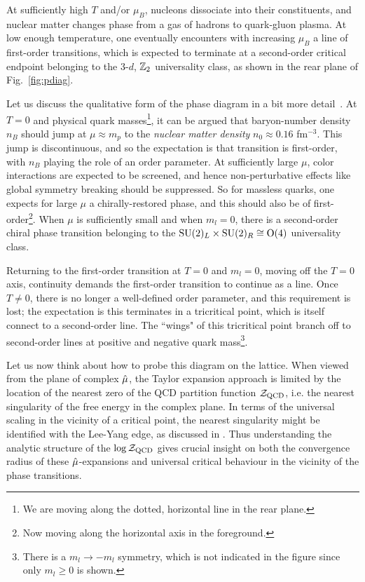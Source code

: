 At sufficiently high $T$ and/or $\mu_B$, nucleons dissociate into their constituents, 
and nuclear matter changes phase from a gas of hadrons to quark-gluon plasma.
At low enough temperature, one eventually encounters with increasing $\mu_B$ a line of 
first-order transitions, which is expected to terminate at a second-order critical 
endpoint belonging to the 3-$d$, $\mathbb{Z}_2$ universality class, as shown in the rear 
plane of Fig.~\ref{fig:pdiag}.

Let us discuss the qualitative form of the phase diagram in a bit more 
detail~\cite{halasz_phase_1998}.
At $T=0$ and physical quark masses\footnote{We are moving along the dotted,
horizontal line in the rear plane.}, it can be argued that baryon-number 
density $n_B$ should jump at
$\mu\approx m_p$ to the {\it nuclear matter density} $n_0\approx 0.16$ fm$^{-3}$. This jump is discontinuous, and
so the expectation is that transition is first-order, with $n_B$
playing the role of an order parameter.
At sufficiently large $\mu$, color interactions are expected to be screened,
and hence non-perturbative effects like global symmetry breaking should
be suppressed. So for massless quarks, one expects for large $\mu$
a chirally-restored phase, and this should also be of 
first-order\footnote{Now moving along the horizontal axis in
the foreground.}. 
When $\mu$ is sufficiently small and when $m_l=0$,
there is a second-order chiral phase transition belonging to the
$\operatorname{SU}(2)_L\times\operatorname{SU}(2)_R\cong\operatorname{\text{O}}(4)$ universality class.

Returning to the first-order transition at $T=0$ and $m_l=0$,
moving off the $T=0$ axis, continuity demands
the first-order transition to continue as a line. Once $T\neq0$, there
is no longer a well-defined order parameter, and this requirement is lost;
the expectation is this terminates in a tricritical point, which is
itself connect to a second-order line. The ``wings" of this tricritical
point branch off to second-order lines at positive and negative quark
mass\footnote{There is a $m_l\to-m_l$ symmetry, which is not indicated
in the figure since only $m_l\geq0$ is shown.}.

Let us now think about how to probe this diagram on the lattice.
When viewed from the plane of complex $\hat{\mu}$, the Taylor expansion 
approach is limited by the location of the nearest zero of the QCD partition 
function $\mathcal{Z}_{\rm QCD}$, i.e. the nearest singularity of the free energy in the 
complex plane. In terms of the universal scaling in the vicinity of a critical 
point, the nearest singularity might be identified with the Lee-Yang 
edge, as discussed in . Thus understanding the analytic 
structure of the $\log\mathcal{Z}_{\rm QCD}$ gives crucial insight on both
the convergence radius of these $\hat{\mu}$-expansions and universal critical behaviour 
in the vicinity of the phase transitions.


